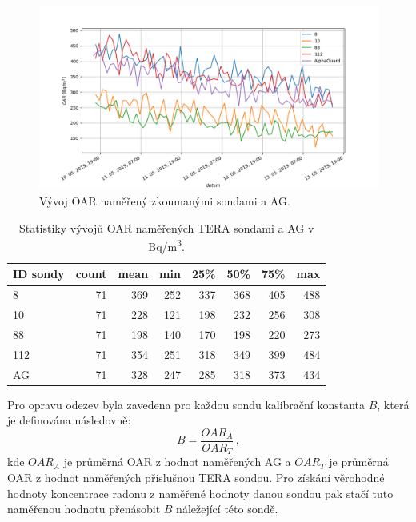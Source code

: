 \begin{figure}[H]
	\centering
	\includegraphics[width=1\linewidth]{images/sondy_srovnani}
	\caption{Vývoj OAR naměřený zkoumanými sondami a AG.}
	\label{fig:dynMer_sondySrovnani}
\end{figure}
\begin{table}[ht]
	\centering
	\caption{Statistiky vývojů OAR naměřených TERA sondami a AG v \si{Bq/m^3}.}
	\label{tab:dynMer_sondy}
	\begin{tabular}{lrrrrrrr}
		\toprule
		ID sondy &  count &  mean    &  min &  25\% &  50\% &  75\% &  max \\
		\midrule
		8          &     71 &   369  &  252 &  337 &  368 &  405 &  488 \\
		10         &     71 &   228  &  121 &  198 &  232 &  256 &  308 \\
		88         &     71 &   198  &  140 &  170 &  198 &  220 &  273 \\
		112        &     71 &   354  &  251 &  318 &  349 &  399 &  484 \\
		\midrule
		AG &     71 &   328  &  247 &  285 &  318 &  373 &  434 \\
		\bottomrule
	\end{tabular}
      
      
\end{table}

Pro opravu odezev byla zavedena pro každou sondu kalibrační konstanta $B$, která je definována následovně:
\begin{equation}
	B=\frac{OAR_A}{OAR_T}\,,
\end{equation}
kde $OAR_A$ je průměrná OAR z hodnot naměřených AG a $OAR_T$ je průměrná OAR z hodnot naměřených příslušnou TERA sondou. Pro získání věrohodné hodnoty koncentrace radonu z naměřené hodnoty danou sondou pak stačí tuto naměřenou hodnotu přenásobit $B$ náležející této sondě.

